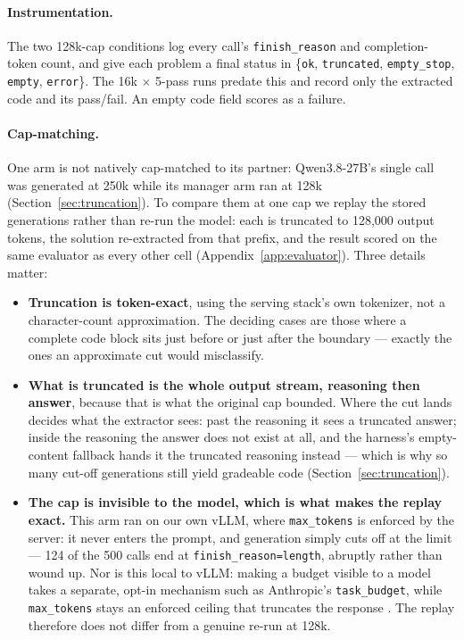 \documentclass{article}
\begin{document}
\paragraph{Instrumentation.} The two 128k-cap conditions log every call's \texttt{finish\_reason}
and completion-token count, and give each problem a final status in \{\texttt{ok},
\texttt{truncated}, \texttt{empty\_stop}, \texttt{empty}, \texttt{error}\}. The 16k $\times$ 5-pass
runs predate this and record only the extracted code and its pass/fail. An empty code field scores
as a failure.

\paragraph{Cap-matching.} One arm is not natively cap-matched to its partner: Qwen3.8-27B's single
call was generated at 250k while its manager arm ran at 128k (Section~\ref{sec:truncation}). To
compare them at one cap we replay the stored generations rather than re-run the model: each is
truncated to 128,000 output tokens, the solution re-extracted from that prefix, and the result
scored on the same evaluator as every other cell (Appendix~\ref{app:evaluator}). Three details
matter:

\begin{itemize}
  \item \textbf{Truncation is token-exact}, using the serving stack's own tokenizer, not a
  character-count approximation. The deciding cases are those where a complete code block sits just
  before or just after the boundary --- exactly the ones an approximate cut would misclassify.

  \item \textbf{What is truncated is the whole output stream, reasoning then answer}, because that
  is what the original cap bounded. Where the cut lands decides what the extractor sees: past the
  reasoning it sees a truncated answer; inside the reasoning the answer does not exist at all, and
  the harness's empty-content fallback hands it the truncated reasoning instead --- which is why so
  many cut-off generations still yield gradeable code (Section~\ref{sec:truncation}).

  \item \textbf{The cap is invisible to the model, which is what makes the replay exact.} This arm
  ran on our own vLLM, where \texttt{max\_tokens} is enforced by the server: it never enters the
  prompt, and generation simply cuts off at the limit --- 124 of the 500 calls end at
  \texttt{finish\_reason=length}, abruptly rather than wound up. Nor is this local to vLLM: making a
  budget visible to a model takes a separate, opt-in mechanism such as Anthropic's
  \texttt{task\_budget}, while \texttt{max\_tokens} stays an enforced ceiling that truncates the
  response \citep{anthropic2026effort}. The replay therefore does not differ from a genuine re-run
  at 128k.
\end{itemize}
\end{document}
